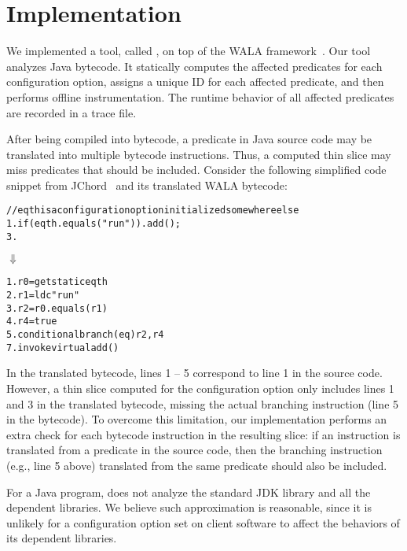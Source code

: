 \section{Implementation}
\label{sec:implementation}

We implemented a tool, called \ourtool, on top of the WALA
framework~\cite{wala}. Our tool analyzes Java bytecode.
It statically computes the affected predicates
for each configuration option, assigns a unique
ID for each affected predicate, and then performs offline instrumentation.
The runtime behavior of all affected predicates are recorded
in a trace file. 


After being compiled into bytecode,
a predicate in Java source code may be translated into multiple bytecode
instructions. Thus, a computed thin slice may
miss predicates that should be included.
Consider the following simplified code snippet from JChord~\cite{chordtutorial}
and its translated WALA bytecode:


\begin{CodeOut}
\begin{alltt}
   // eqth is a configuration option initialized somewhere else
1. if (eqth.equals("run")) .   add();
3. \ttrcb
\end{alltt}
\end{CodeOut}
\vspace{-2mm}
\hspace{20mm}$\Downarrow$ 
\begin{CodeOut}
\begin{alltt}
1. r0 = getstatic eqth
2. r1 = ldc "run"
3. r2 = r0.equals(r1)
4. r4 = true
5. conditional branch(eq) r2, r4
7. invokevirtual add() 
\end{alltt}
\end{CodeOut}

In the translated bytecode, lines 1 -- 5 correspond to line 1 in the
source code. However, a thin slice computed
for the configuration option  only includes lines 1 and 3
in the translated bytecode, missing the actual branching
instruction (line 5 in the bytecode).
To overcome this limitation, our implementation performs an extra check
for each bytecode instruction in the resulting slice:
if an instruction 
is translated from a predicate in the source code, then the
branching instruction (e.g., line 5 above) translated
from the same predicate should also be included.


For a Java program, \ourtool does not analyze the standard JDK
library and all the dependent libraries. We believe such approximation
is reasonable, since it is
unlikely for a configuration option set on client software
to affect the behaviors of its dependent libraries.

